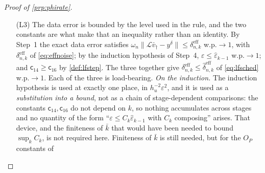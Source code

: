 \begin{proof}[Proof of \cref{prp:phirate}]
\begin{enumerate}
\begin{equation}
\;=\;\omega_n^{-2}\,\hat{\mathcal P}^{\,\mathcal S}_{\varphi_\circ} ,
\end{equation}
the \emph{compression} \eqref{eq:compress} of $\hat{\mathcal A}^{\ast}\hat{\mathcal A}$ to
$\mathcal S_n$, and \textbf{not} the restriction of $\hat{\mathcal A}^{\ast}\hat{\mathcal A}$ to
$\mathcal S_n$. Second, \emph{the two are not the same operator and their ranges are nested in neither
direction}, so ``$\bar v_\dagger\in\mathcal R\big((\hat{\mathcal A}^{\ast}\hat{\mathcal A})^{\mu}\big)\cap\mathcal S_n$''
and ``$\bar v_\dagger\in\mathcal R\big((\hat{\mathcal P}^{\,\mathcal S})^{\mu}\big)$'' are different
statements: $\hat{\mathcal A}^{\ast}\hat{\mathcal A}$ need not preserve $\mathcal S_n$, and
$\hat{\mathcal P}^{\,\mathcal S}$ is a different operator on $\mathcal S_n$ from
$\hat{\mathcal A}^{\ast}\hat{\mathcal A}\vert_{\mathcal S_n}$ unless it does. (P-a.3) states the
hypothesis at \eqref{eq:compress}, so the two agree, and \cref{lem:scaleinv}(iii), stated for a single
fixed domain and handling only the scalar rescaling, is not asked to bridge a gap it cannot bridge.
\item[(L3)] The data error is bounded by the level used in the rule, and the two constants are
what make that an inequality rather than an identity. By Step~1 the exact data error satisfies
$\omega_n\|\mathcal L\bar v_\dagger-y^\delta\|\le\delta^{\mathrm{eff}}_{n,k}$ w.p.$\to1$, with
$\delta^{\mathrm{eff}}_{n,k}$ of \eqref{eq:effnoise}; by the induction hypothesis of Step~4,
$\varepsilon\le\hat\varepsilon_{k-1}$ w.p.$\to1$; and $\mathsf c_{14}\ge\mathsf c_{16}$ by
\cref{def:lfstep}. The three together give
$\delta^{\mathrm{eff}}_{n,k}\le\hat\delta^{\mathrm{eff}}_{n,k}$ of \eqref{eq:lfsched} w.p.$\to1$.
Each of the three is load-bearing.
\emph{On the induction.}
The induction hypothesis is used at exactly one place, in $h_u^{-2}\varepsilon^{2}$, and it is used as
a \emph{substitution into a bound}, not as a chain of stage-dependent comparisons: the constants
$\mathsf c_{14},\mathsf c_{16}$ do not depend on $k$, so nothing accumulates across stages and no
quantity of the form ``$\varepsilon\le C_k\hat\varepsilon_{k-1}$ with $C_k$ composing'' arises. That
device, and the finiteness of $\bar k$ that would have been needed to bound $\sup_kC_k$, is not
required here. Finiteness of $\bar k$ is still needed, but for the $O_P$ constants of

\end{enumerate}
\end{proof}
